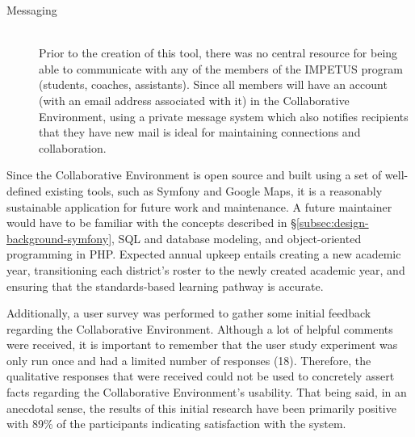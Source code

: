 \begin{description}
	\item [Messaging] \hfill \\ Prior to the creation of this tool, there was no central resource for being able to communicate with any of the members of the IMPETUS program (students, coaches, assistants). Since all members will have an account (with an email address associated with it) in the Collaborative Environment, using a private message system which also notifies recipients that they have new mail is ideal for maintaining connections and collaboration.
\end{description}

Since the Collaborative Environment is open source and built using a set of well-defined existing tools, such as Symfony and Google Maps, it is a reasonably sustainable application for future work and maintenance. A future maintainer would have to be familiar with the concepts described in \S \ref{subsec:design-background-symfony}, SQL and database modeling, and object-oriented programming in PHP. Expected annual upkeep entails creating a new academic year, transitioning each district's roster to the newly created academic year, and ensuring that the standards-based learning pathway is accurate.

Additionally, a user survey was performed to gather some initial feedback regarding the Collaborative Environment. Although a lot of helpful comments were received, it is important to remember that the user study experiment was only run once and had a limited number of responses (18). Therefore, the qualitative responses that were received could not be used to concretely assert facts regarding the Collaborative Environment's usability. That being said, in an anecdotal sense, the results of this initial research have been primarily positive with 89\% of the participants indicating satisfaction with the system.

